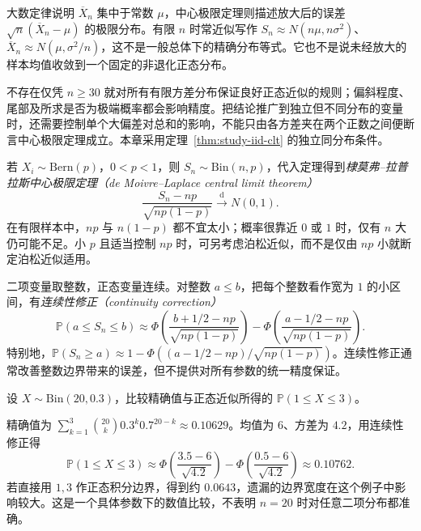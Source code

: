 大数定律说明 $\overline X_n$ 集中于常数 $\mu$，中心极限定理则描述放大后的误差 $\sqrt n(\overline X_n-\mu)$ 的极限分布。有限 $n$ 时常近似写作 $S_n\approx N(n\mu,n\sigma^2)$、$\overline X_n\approx N(\mu,\sigma^2/n)$，这不是一般总体下的精确分布等式。它也不是说未经放大的样本均值收敛到一个固定的非退化正态分布。

\begin{notealert}[type=caution,title={核对条件与近似精度}]
不存在仅凭 $n\ge30$ 就对所有有限方差分布保证良好正态近似的规则；偏斜程度、尾部及所求是否为极端概率都会影响精度。把结论推广到独立但不同分布的变量时，还需要控制单个大偏差对总和的影响，不能只由各方差夹在两个正数之间便断言中心极限定理成立。本章采用定理~\ref{thm:study-iid-clt} 的独立同分布条件。
\end{notealert}

若 $X_i\sim\mathrm{Bern}(p)$，$0<p<1$，则 $S_n\sim\mathrm{Bin}(n,p)$，代入定理得到\emph{棣莫弗--拉普拉斯中心极限定理（de Moivre--Laplace central limit theorem）}
\begin{equation}
  \frac{S_n-np}{\sqrt{np(1-p)}}\xrightarrow{\mathrm d}N(0,1).
  \label{eq:study-binomial-clt}
\end{equation}
在有限样本中，$np$ 与 $n(1-p)$ 都不宜太小；概率很靠近 $0$ 或 $1$ 时，仅有 $n$ 大仍可能不足。小 $p$ 且适当控制 $np$ 时，可另考虑泊松近似，而不是仅由 $np$ 小就断定泊松近似适用。

二项变量取整数，正态变量连续。对整数 $a\le b$，把每个整数看作宽为 $1$ 的小区间，有\emph{连续性修正（continuity correction）}
\begin{equation}
  \mathbb P(a\le S_n\le b)
    \approx\Phi\left(\frac{b+1/2-np}{\sqrt{np(1-p)}}\right)
      -\Phi\left(\frac{a-1/2-np}{\sqrt{np(1-p)}}\right).
  \label{eq:study-continuity-correction}
\end{equation}
特别地，$\mathbb P(S_n\ge a)\approx1-\Phi((a-1/2-np)/\sqrt{np(1-p)})$。连续性修正通常改善整数边界带来的误差，但不提供对所有参数的统一精度保证。

\begin{example}
\label{ex:study-binomial-normal-approximation}
设 $X\sim\mathrm{Bin}(20,0.3)$，比较精确值与正态近似所得的 $\mathbb P(1\le X\le3)$。
\end{example}

\begin{solve}
精确值为 $\sum_{k=1}^3\binom{20}k0.3^k0.7^{20-k}\approx0.10629$。均值为 $6$、方差为 $4.2$，用连续性修正得
\[
  \mathbb P(1\le X\le3)
    \approx\Phi\left(\frac{3.5-6}{\sqrt{4.2}}\right)
      -\Phi\left(\frac{0.5-6}{\sqrt{4.2}}\right)
    \approx0.10762.
\]
若直接用 $1,3$ 作正态积分边界，得到约 $0.0643$，遗漏的边界宽度在这个例子中影响较大。这是一个具体参数下的数值比较，不表明 $n=20$ 时对任意二项分布都准确。
\end{solve}

